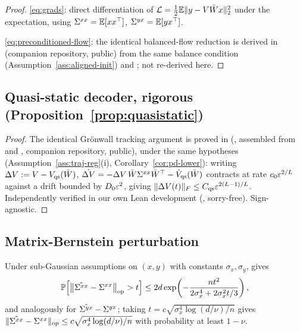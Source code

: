 \begin{proof}
\eqref{eq:grads}: direct differentiation of
$\mathcal{L} = \tfrac12\mathbb{E}\|y - V\bar{W} x\|_2^2$ under the expectation,
using $\Sigma^{xx} = \mathbb{E}[xx^\top]$, $\Sigma^{yx} = \mathbb{E}[yx^\top]$.

\eqref{eq:preconditioned-flow}: the identical balanced-flow reduction is
derived in \citet[\S2.3]{Goh2026ordering} (companion repository, public)
from the same balance condition (Assumption~\ref{ass:aligned-init}) and
\citet{Arora2018}; not re-derived here.
\end{proof}

\subsection{Quasi-static decoder, rigorous (Proposition~\ref{prop:quasistatic})}
\label{ssec:quasistatic-proof}

\begin{proof}
The identical Gr\"onwall tracking argument is proved in
\citet[\S6, Prop.~(Bootstrap consistency), item~3]{Goh2026ordering}
(, assembled from
 and ,
companion repository, public), under the same hypotheses
(Assumption~\ref{ass:traj-reg}(i), Corollary~\ref{cor:pd-lower}): writing
$\Delta V := V - V_{\mathrm{qs}}(\bar{W})$, $\dot{\Delta V} =
-\Delta V\,\bar{W}\Sigma^{xx}\bar{W}^\top - \dot V_{\mathrm{qs}}(\bar{W})$ contracts at
rate $c_0\varepsilon^{2/L}$ against a drift bounded by $D_0\varepsilon^2$, giving
$\|\Delta V(t)\|_F \le C_{\mathrm{qs}}\varepsilon^{2(L-1)/L}$. Independently
verified in our own Lean development
(, sorry-free). Sign-agnostic.
\end{proof}

\subsection{Matrix-Bernstein perturbation}
\label{ssec:bernstein}

Under sub-Gaussian assumptions on $(x,y)$ with constants $\sigma_x,\sigma_y$,
\citet[Thm~1.6.2]{Tropp2015} gives
\begin{equation}
\label{eq:bernstein-cov}
\mathbb{P}\!\left[
\big\|\hat{\Sigma^{xx}} - \Sigma^{xx}\big\|_{\mathrm{op}} > t
\right]
\le 2d \exp\!\left( -\frac{n t^2}{2\sigma_x^4 + 2\sigma_x^2 t / 3} \right),
\end{equation}
and analogously for $\hat{\Sigma^{yx}} - \Sigma^{yx}$; taking $t = c\sqrt{\sigma_x^4\log(d/\nu)/n}$
gives $\|\hat{\Sigma^{xx}} - \Sigma^{xx}\|_{\mathrm{op}} \le c\sqrt{\sigma_x^4\log(d/\nu)/n}$ with
probability at least $1-\nu$.

